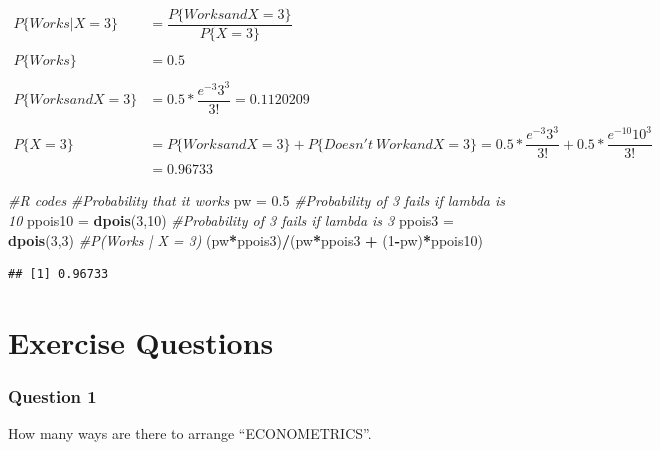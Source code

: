 \documentclass[]{book}
\newenvironment{Shaded}{\begin{snugshade}}{\end{snugshade}}
\newcommand{\CommentTok}[1]{\textcolor[rgb]{0.56,0.35,0.01}{\textit{#1}}}
\newcommand{\DecValTok}[1]{\textcolor[rgb]{0.00,0.00,0.81}{#1}}
\newcommand{\FloatTok}[1]{\textcolor[rgb]{0.00,0.00,0.81}{#1}}
\newcommand{\KeywordTok}[1]{\textcolor[rgb]{0.13,0.29,0.53}{\textbf{#1}}}
\newcommand{\NormalTok}[1]{#1}
\newcommand{\OperatorTok}[1]{\textcolor[rgb]{0.81,0.36,0.00}{\textbf{#1}}}
\newcommand{\StringTok}[1]{\textcolor[rgb]{0.31,0.60,0.02}{#1}}
\theoremstyle{definition}
\theoremstyle{definition}
\theoremstyle{definition}
\theoremstyle{remark}
\begin{document}
\begin{enumerate}
  \begin{align*}
   P\{Works | X = 3\}  &= \dfrac{P\{Works and X = 3\}}{P\{X = 3\}} \\~\\
   P\{Works\} &= 0.5\\~\\
   P\{Works and X = 3\} &= 0.5 * \dfrac{e^{-3}3^3}{3!} = 0.1120209\\~\\
   P\{X = 3\} &= P\{Works and X = 3\} + P\{Doesn't\ Work and X = 3\} = 0.5 * \dfrac{e^{-3}3^3}{3!} + 0.5 * \dfrac{e^{-10}10^3}{3!} \\
   &= 0.96733
   \end{align*}

\begin{Shaded}
\begin{Highlighting}[]
\CommentTok{#R codes}
\CommentTok{#Probability that it works}
\NormalTok{pw =}\StringTok{ }\FloatTok{0.5}
\CommentTok{#Probability of 3 fails if lambda is 10}
\NormalTok{ppois10 =}\StringTok{ }\KeywordTok{dpois}\NormalTok{(}\DecValTok{3}\NormalTok{,}\DecValTok{10}\NormalTok{)}
\CommentTok{#Probability of 3 fails if lambda is 3}
\NormalTok{ppois3 =}\StringTok{ }\KeywordTok{dpois}\NormalTok{(}\DecValTok{3}\NormalTok{,}\DecValTok{3}\NormalTok{)}
\CommentTok{#P(Works | X = 3)}
\NormalTok{(pw}\OperatorTok{*}\NormalTok{ppois3)}\OperatorTok{/}\NormalTok{(pw}\OperatorTok{*}\NormalTok{ppois3 }\OperatorTok{+}\StringTok{ }\NormalTok{(}\DecValTok{1}\OperatorTok{-}\NormalTok{pw)}\OperatorTok{*}\NormalTok{ppois10)}
\end{Highlighting}
\end{Shaded}

\begin{verbatim}
## [1] 0.96733
\end{verbatim}
\end{enumerate}

\hypertarget{exercise-questions}{%
\chapter{Exercise Questions}\label{exercise-questions}}

\hypertarget{question-1}{%
\subsection{Question 1}\label{question-1}}

How many ways are there to arrange ``ECONOMETRICS''.
\end{document}
